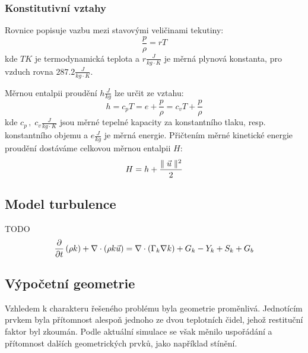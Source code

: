         \subsubsection{Konstitutivní vztahy}
        Rovnice popisuje vazbu mezi stavovými veličinami tekutiny:
        \begin{equation} \label{eq:stavova-rovnice}
            \frac{p}{\rho} = r T
        \end{equation}
        \noindent kde $T \unit{K}$ je termodynamická teplota a $r \unit{\frac{J}{kg \cdot K}}$ je měrná plynová konstanta, pro vzduch rovna $287.2 \unit{\frac{J}{kg \cdot K}}$.
        
        Měrnou entalpii proudění $h \unit{\frac{J}{kg}}$ lze určit ze vztahu:
        \begin{equation} \label{eq:entalpie}
            h = c_p T = e + \frac{p}{\rho} = c_v T + \frac{p}{\rho}
        \end{equation}
        \noindent kde $c_p \, , \; c_v  \unit{\frac{J}{kg \cdot K}}$ jsou měrné tepelné kapacity za konstantního tlaku, resp. konstantního objemu a $e \unit{\frac{J}{kg}}$ je měrná energie. Přičtením měrné kinetické energie proudění dostáváme celkovou měrnou entalpii $H$:
        \begin{equation} \label{eq:celkova-entalpie}
            H = h + \frac{\parallel \Vec{u} \parallel^2}{2}
        \end{equation}
        
    \subsection{Model turbulence}
        TODO
        \begin{equation} \label{eq:rovnice-pro-k} 
             \frac{\partial}{\partial t} \left( \rho k \right) + \nabla \cdot \left( \rho k \Vec{u} \right) = \nabla \cdot \left( \Gamma _k \nabla k \right) + G _k - Y _k + S _k + G _b
        \end{equation}
    \newpage
    \subsection{Výpočetní geometrie}
        Vzhledem k charakteru řešeného problému byla geometrie proměnlivá. Jednotícím prvkem byla přítomnost alespoň jednoho ze dvou teplotních čidel, jehož restituční faktor byl zkoumán. Podle aktuální simulace se však měnilo uspořádání a přítomnost dalších geometrických prvků, jako například stínění.
    
